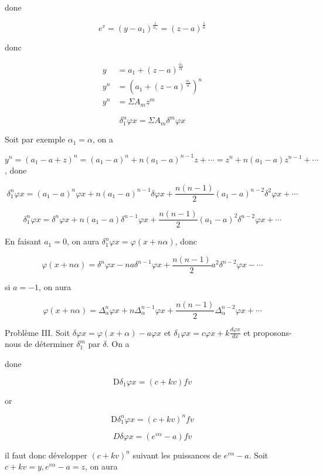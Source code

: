 \documentclass{article}
\begin{document}
done

\[
e^{v}=\left(y-a_{1}\right)^{\frac{1}{\alpha_{1}}}=(z-a)^{\frac{1}{\alpha}}
\]

donc

\[
\begin{aligned}
y & =a_{1}+(z-a)^{\frac{\alpha_{1}}{\alpha}} \\
y^{n} & =\left(a_{1}+(z-a)^{\frac{\alpha_{1}}{\alpha}}\right)^{n} \\
y^{n} & =\Sigma A_{m} z^{m}
\end{aligned}
\]

\[
\delta_{1}^{n} \varphi x=\Sigma A_{m} \delta^{m} \varphi x
\]

Soit par exemple \(\alpha_{1}=\alpha\), on a

\(y^{n}=\left(a_{1}-a+z\right)^{n}=\left(a_{1}-a\right)^{n}+n\left(a_{1}-a\right)^{n-1} z+\cdots=z^{n}+n\left(a_{1}-a\right) z^{n-1}+\cdots\), done

\[
\delta_{1}^{n} \varphi x=\left(a_{1}-a\right)^{n} \varphi x+n\left(a_{1}-a\right)^{n-1} \delta \varphi x+\frac{n(n-1)}{2}\left(a_{1}-a\right)^{n-2} \delta^{2} \varphi x+\cdots
\]

\[
\delta_{1}^{n} \varphi x=\delta^{n} \varphi x+n\left(a_{1}-a\right) \delta^{n-1} \varphi x+\frac{n(n-1)}{2}\left(a_{1}-a\right)^{2} \delta^{n-2} \varphi x+\cdots
\]

En faisant \(a_{1}=0\), on aura \(\delta_{1}^{n} \varphi x=\varphi(x+n \alpha)\), donc

\[
\varphi(x+n \alpha)=\delta^{n} \varphi x-n a \delta^{n-1} \varphi x+\frac{n(n-1)}{2} a^{2} \delta^{n-2} \varphi x-\cdots
\]

si \(a=-1\), on aura

\[
\varphi(x+n \alpha)=\Delta_{\alpha}^{n} \varphi x+n \Delta_{\alpha}^{n-1} \varphi x+\frac{n(n-1)}{2} \Delta_{\alpha}^{n-2} \varphi x+\cdots
\]

Problème III. Soit \(\delta \varphi x=\varphi(x+\alpha)-a \varphi x\) et \(\delta_{1} \varphi x=c \varphi x+k \frac{d \varphi x}{d x}\) et proposons-nous de déterminer \(\delta_{1}^{m}\) par \(\delta\). On a

done

\[
\mathrm{D} \delta_{1} \varphi x=(c+k v) f v
\]

or

\[
\mathrm{D} \delta_{1}^{n} \varphi x=(c+k v)^{n} f v
\]

\[
D \delta \varphi x=\left(e^{v \alpha}-a\right) f v
\]

il faut donc développer \((c+k v)^{n}\) suivant les puissances de \(e^{v \alpha}-a\). Soit \(c+k v=y, e^{v \alpha}-a=z\), on aura
\end{document}
